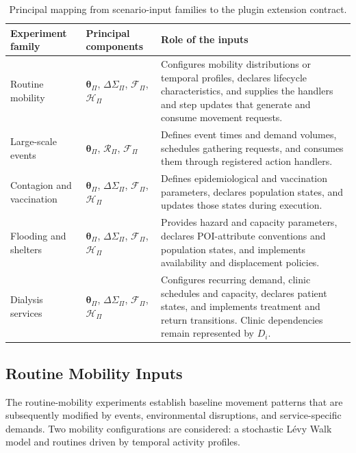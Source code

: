 \begin{table}[ht]
\color{red}
\centering
\footnotesize
\setlength{\tabcolsep}{4pt}
\caption{Principal mapping from scenario-input families to the plugin extension contract.}
\label{tbl:input_plugin_mapping}
\begin{tabularx}{\linewidth}{@{}p{3.0cm}p{3.4cm}X@{}}
\toprule
\textbf{Experiment family} & \textbf{Principal components} & \textbf{Role of the inputs} \\
\midrule
Routine mobility
& $\bm{\theta}_{\Pi}$, $\Delta\Sigma_{\Pi}$, $\mathcal{F}_{\Pi}$, $\mathcal{H}_{\Pi}$
& Configures mobility distributions or temporal profiles, declares lifecycle characteristics, and supplies the handlers and step updates that generate and consume movement requests. \\
Large-scale events
& $\bm{\theta}_{\Pi}$, $\mathcal{R}_{\Pi}$, $\mathcal{F}_{\Pi}$
& Defines event times and demand volumes, schedules gathering requests, and consumes them through registered action handlers. \\
Contagion and vaccination
& $\bm{\theta}_{\Pi}$, $\Delta\Sigma_{\Pi}$, $\mathcal{F}_{\Pi}$, $\mathcal{H}_{\Pi}$
& Defines epidemiological and vaccination parameters, declares population states, and updates those states during execution. \\
Flooding and shelters
& $\bm{\theta}_{\Pi}$, $\Delta\Sigma_{\Pi}$, $\mathcal{F}_{\Pi}$, $\mathcal{H}_{\Pi}$
& Provides hazard and capacity parameters, declares POI-attribute conventions and population states, and implements availability and displacement policies. \\
Dialysis services
& $\bm{\theta}_{\Pi}$, $\Delta\Sigma_{\Pi}$, $\mathcal{F}_{\Pi}$, $\mathcal{H}_{\Pi}$
& Configures recurring demand, clinic schedules and capacity, declares patient states, and implements treatment and return transitions. Clinic dependencies remain represented by $D_i$. \\
\bottomrule
\end{tabularx}
\end{table}

\subsection{Routine Mobility Inputs}
\label{sec:behavioral_policy_input_data}

The routine-mobility experiments establish baseline movement patterns that are subsequently modified by events, environmental disruptions, and service-specific demands. Two mobility configurations are considered: a stochastic L\'evy Walk model and routines driven by temporal activity profiles.


